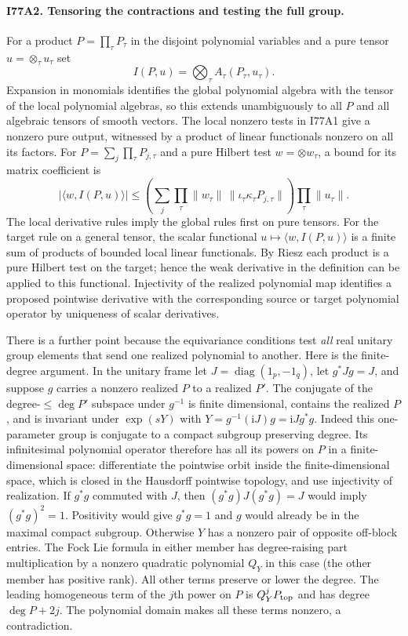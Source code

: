 \paragraph{I77A2. Tensoring the contractions and testing the full group.}
For a product $P=\prod_\tau P_\tau$ in the disjoint polynomial
variables and a pure tensor $u=\otimes_\tau u_\tau$ set
\[
                 I(P,u)=\bigotimes_\tau A_\tau(P_\tau,u_\tau).
\]
Expansion in monomials identifies the global polynomial algebra
with the tensor of the local polynomial algebras, so this extends
unambiguously to all $P$ and all algebraic tensors of smooth vectors.
The local nonzero tests in I77A1 give a nonzero pure output, witnessed
by a product of linear functionals nonzero on all its factors.
For $P=\sum_j\prod_\tau P_{j,\tau}$ and a pure Hilbert test
$w=\otimes w_\tau$, a bound for its matrix coefficient is
\[
 |\langle w,I(P,u)\rangle|
 \le \left(\sum_j\prod_\tau
             \|w_\tau\|\,\|\iota_\tau\kappa_\tau P_{j,\tau}\|\right)
                \prod_\tau\|u_\tau\|.
\]
The local derivative rules imply the global rules first on pure
tensors. For the target rule on a general tensor, the scalar
functional $u\mapsto\langle w,I(P,u)\rangle$ is a finite sum of
products of bounded local linear functionals. By Riesz each product
is a pure Hilbert test on the target; hence the weak derivative in
the definition can be applied to this functional. Injectivity of
the realized polynomial map identifies a proposed pointwise
derivative with the corresponding source or target polynomial
operator by uniqueness of scalar derivatives.

There is a further point because the equivariance conditions test
\emph{all} real unitary group elements that send one realized
polynomial to another. Here is the finite-degree argument. In the
unitary frame let $J=\operatorname{diag}(1_p,-1_q)$, let $g^*Jg=J$,
and suppose $g$ carries a nonzero realized $P$ to a realized $P'$.
The conjugate of the degree-$\le\deg P'$ subspace under $g^{-1}$
is finite dimensional, contains the realized $P$, and is invariant
under $\exp(sY)$ with $Y=g^{-1}(\mathrm iJ)g=\mathrm iJg^*g$.
Indeed this one-parameter group is conjugate to a compact subgroup
preserving degree. Its infinitesimal polynomial operator therefore
has all its powers on $P$ in a finite-dimensional space: differentiate
the pointwise orbit inside the finite-dimensional space, which is
closed in the Hausdorff pointwise topology, and use injectivity of
realization. If $g^*g$ commuted with $J$, then $(g^*g)J(g^*g)=J$
would imply $(g^*g)^2=1$. Positivity would give $g^*g=1$ and $g$
would already be in the maximal compact subgroup.
Otherwise $Y$ has a nonzero pair of opposite off-block entries.
The Fock Lie formula in either member has degree-raising part
multiplication by a nonzero quadratic polynomial $Q_Y$ in this case
(the other member has positive rank). All other terms preserve or
lower the degree. The leading homogeneous term of the $j$th power
on $P$ is $Q_Y^j P_{\rm top}$ and has degree $\deg P+2j$.
The polynomial domain makes all these terms nonzero, a contradiction.


